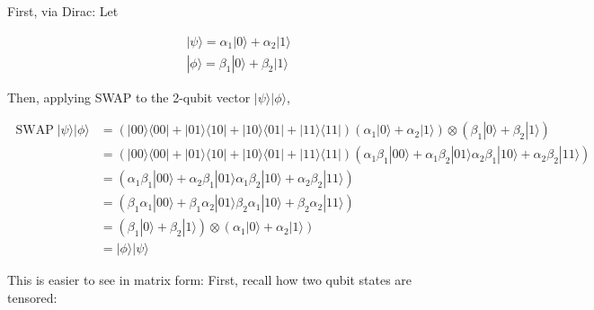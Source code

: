 \documentclass[main.tex]{subfiles}
\begin{document}
    First, via Dirac: Let
    
    $$
    \begin{aligned}
    &|\psi\rangle=\alpha_{1}|0\rangle+\alpha_{2}|1\rangle \\
    &|\phi\rangle=\beta_{1}|0\rangle+\beta_{2}|1\rangle
    \end{aligned}
    $$
    
    Then, applying SWAP to the 2-qubit vector $|\psi\rangle|\phi\rangle$,
    
    $$
    \begin{aligned}
    \operatorname{SWAP}|\psi\rangle|\phi\rangle &=(|00\rangle\langle 00|+| 01\rangle\langle 10|+| 10\rangle\langle 01|+| 11\rangle\langle 11|)\left(\alpha_{1}|0\rangle+\alpha_{2}|1\rangle\right) \otimes\left(\beta_{1}|0\rangle+\beta_{2}|1\rangle\right) \\
    &=(|00\rangle\langle 00|+| 01\rangle\langle 10|+| 10\rangle\langle 01|+| 11\rangle\langle 11|)\left(\alpha_{1} \beta_{1}|00\rangle+\alpha_{1} \beta_{2}|01\rangle \alpha_{2} \beta_{1}|10\rangle+\alpha_{2} \beta_{2}|11\rangle\right) \\
    &=\left(\alpha_{1} \beta_{1}|00\rangle+\alpha_{2} \beta_{1}|01\rangle \alpha_{1} \beta_{2}|10\rangle+\alpha_{2} \beta_{2}|11\rangle\right) \\
    &=\left(\beta_{1} \alpha_{1}|00\rangle+\beta_{1} \alpha_{2}|01\rangle \beta_{2} \alpha_{1}|10\rangle+\beta_{2} \alpha_{2}|11\rangle\right) \\
    &=\left(\beta_{1}|0\rangle+\beta_{2}|1\rangle\right) \otimes\left(\alpha_{1}|0\rangle+\alpha_{2}|1\rangle\right) \\
    &=|\phi\rangle|\psi\rangle
    \end{aligned}
    $$
    
    This is easier to see in matrix form: First, recall how two qubit states are tensored:
    
\end{document}
